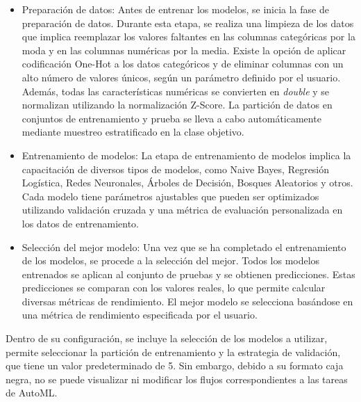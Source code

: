 \begin{itemize}
	\item Preparación de datos: Antes de entrenar los modelos, se inicia la fase de preparación de datos. Durante esta etapa, se realiza una limpieza de los datos que implica reemplazar los valores faltantes en las columnas categóricas por la moda y en las columnas numéricas por la media. Existe la opción de aplicar codificación One-Hot a los datos categóricos y de eliminar columnas con un alto número de valores únicos, según un parámetro definido por el usuario. Además, todas las características numéricas se convierten en \textit{double} y se normalizan utilizando la normalización Z-Score. La partición de datos en conjuntos de entrenamiento y prueba se lleva a cabo automáticamente mediante muestreo estratificado en la clase objetivo.
	\item Entrenamiento de modelos: La etapa de entrenamiento de modelos implica la capacitación de diversos tipos de modelos, como Naive Bayes, Regresión Logística, Redes Neuronales, Árboles de Decisión, Bosques Aleatorios y otros. Cada modelo tiene parámetros ajustables que pueden ser optimizados utilizando validación cruzada y una métrica de evaluación personalizada en los datos de entrenamiento. 
	\item Selección del mejor modelo: Una vez que se ha completado el entrenamiento de los modelos, se procede a la selección del mejor. Todos los modelos entrenados se aplican al conjunto de pruebas y se obtienen predicciones. Estas predicciones se comparan con los valores reales, lo que permite calcular diversas métricas de rendimiento. El mejor modelo se selecciona basándose en una métrica de rendimiento especificada por el usuario.
\end{itemize}

Dentro de su configuración, se incluye la selección de los modelos a utilizar, permite seleccionar la partición de entrenamiento y la estrategia de validación, que tiene un valor predeterminado de 5. Sin embargo, debido a su formato caja negra, no se puede visualizar ni modificar los flujos correspondientes a las tareas de AutoML.

